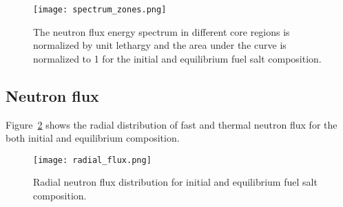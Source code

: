 \begin{figure}[ht!] %
  \centering
  \texttt{[image: spectrum\_zones.png]} 
  \caption{The neutron flux energy spectrum in different core regions is normalized by 
unit lethargy and the area under the curve is normalized to 1 for the initial and equilibrium fuel salt composition.}
  \label{fig:spectrum_zones}
\end{figure}

\subsection{Neutron flux}
Figure~\ref{fig:radial_flux} shows the radial distribution of fast and thermal 
neutron flux for the both initial and equilibrium composition. 
\begin{figure}[ht!] %
  \texttt{[image: radial\_flux.png]} \caption{Radial neutron 
  flux distribution for initial and equilibrium fuel salt composition.}
  \label{fig:radial_flux}
\end{figure}


